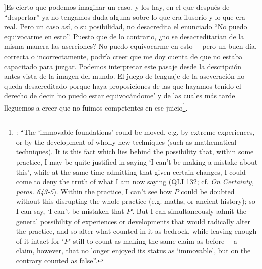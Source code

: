 ]{Es cierto que podemos imaginar un caso, y los hay, en el que después de ``despertar'' ya no tengamos duda alguna sobre lo que era ilusorio y lo que era real. Pero un caso así, o su posibilidad, no desacredita el enunciado ``No puedo equivocarme en esto''. Puesto que de lo contrario, ¿no se desacreditarían de la misma manera las aserciones? No puedo equivocarme en esto\,---\,pero un buen día, correcta o incorrectamente, podría creer que me doy cuenta de que no estaba capacitado para juzgar}. Podemos interpretar este pasaje desde la descripción antes vista de la imagen del mundo. El juego de lenguaje de la aseveración no queda desacreditado porque haya proposiciones de las que hayamos tenido el derecho de decir `no puedo estar equivocándome' y de las cuales más tarde lleguemos a creer que no fuimos competentes en ese juicio\footnote{\cite[Cf.][223]{teichmann2008ans}: \enquote{The `immovable foundations' could be moved, e.g. by extreme experiences, or by the development of wholly new techniques (such as mathematical techniques). It is this fact which lies behind the possibility that, within some practice, I may be quite justified in saying `I can't be making a mistake about this', while at the same time admitting that given certain changes, I could come to deny the truth of what I am now saying (QLI 132; cf. \emph{On Certainty, paras. 643-5}). Within the practice, I can't see how $P$ could be doubted without this disrupting the whole practice (e.g. maths, or ancient history); so I can say, `I can't be mistaken that $P$'. But I can simultaneously admit the general possibility of experiences or developments that would radically alter the practice, and so alter what counted in it as bedrock, while leaving enough of it intact for `$P$' still to count as making the same claim as before\,---\,a claim, however, that no longer enjoyed its status as `immovable', but on the contrary counted as false}.}.

